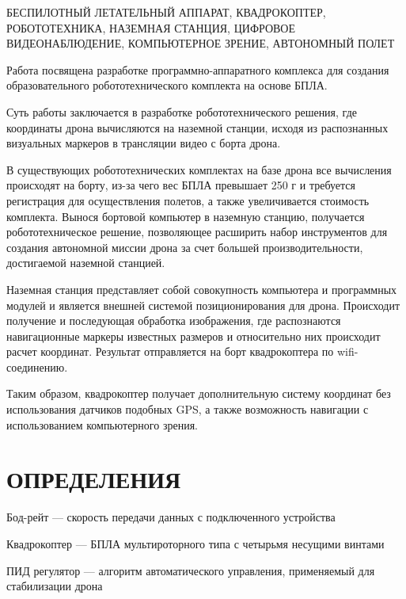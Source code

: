 \documentclass[a4paper,12pt]{article}
\begin{document}
БЕСПИЛОТНЫЙ ЛЕТАТЕЛЬНЫЙ АППАРАТ, КВАДРОКОПТЕР, РОБОТОТЕХНИКА, НАЗЕМНАЯ СТАНЦИЯ, ЦИФРОВОЕ ВИДЕОНАБЛЮДЕНИЕ, КОМПЬЮТЕРНОЕ ЗРЕНИЕ, АВТОНОМНЫЙ ПОЛЕТ

Работа посвящена разработке программно-аппаратного комплекса для создания образовательного робототехнического комплекта на основе БПЛА.

Суть работы заключается в разработке робототехнического решения, где координаты дрона вычисляются на наземной станции, исходя из распознанных визуальных маркеров в трансляции видео с борта дрона.

В существующих робототехнических комплектах на базе дрона все вычисления происходят на борту, из-за чего вес БПЛА превышает 250 г и требуется регистрация для осуществления полетов, а также увеличивается стоимость комплекта. Вынося бортовой компьютер в наземную станцию, получается робототехническое решение, позволяющее расширить набор инструментов для создания автономной миссии дрона за счет большей производительности, достигаемой наземной станцией. 

Наземная станция представляет собой совокупность компьютера и программных модулей и является внешней системой позиционирования для дрона. Происходит получение и последующая обработка изображения, где распознаются навигационные маркеры известных размеров и относительно них происходит расчет координат. Результат отправляется на борт квадрокоптера по wifi-соединению.
 
Таким образом, квадрокоптер получает дополнительную систему координат без использования датчиков подобных GPS, а также возможность навигации с использованием компьютерного зрения.

\pagebreak
\thispagestyle{empty}

\section*{\centering ОПРЕДЕЛЕНИЯ}

\thispagestyle{empty} %

Бод-рейт --- скорость передачи данных с подключенного устройства

Квадрокоптер --- БПЛА мультироторного типа с четырьмя несущими винтами

ПИД регулятор --- алгоритм автоматического управления, применяемый для стабилизации дрона
\end{document}

